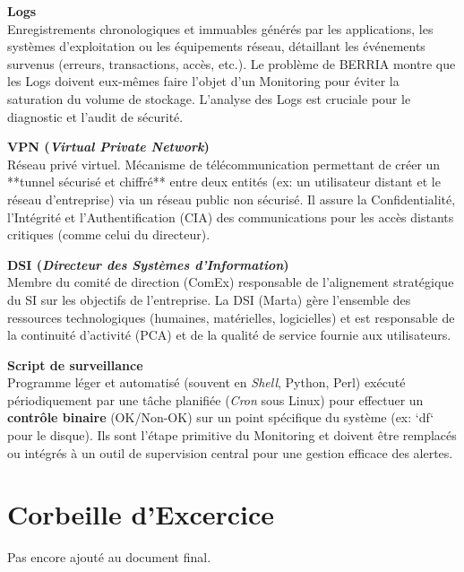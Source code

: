 \noindent \textbf{Logs} \\
Enregistrements chronologiques et immuables générés par les applications, les systèmes d'exploitation ou les équipements réseau, détaillant les événements survenus (erreurs, transactions, accès, etc.). Le problème de BERRIA montre que les Logs doivent eux-mêmes faire l'objet d'un Monitoring pour éviter la saturation du volume de stockage. L'analyse des Logs est cruciale pour le diagnostic et l'audit de sécurité.
\vspace{0.5em}

\noindent \textbf{VPN (\textit{Virtual Private Network})} \\
Réseau privé virtuel. Mécanisme de télécommunication permettant de créer un **tunnel sécurisé et chiffré** entre deux entités (ex: un utilisateur distant et le réseau d'entreprise) via un réseau public non sécurisé. Il assure la Confidentialité, l'Intégrité et l'Authentification (CIA) des communications pour les accès distants critiques (comme celui du directeur).
\vspace{0.5em}

\noindent \textbf{DSI (\textit{Directeur des Systèmes d'Information})} \\
Membre du comité de direction (ComEx) responsable de l'alignement stratégique du SI sur les objectifs de l'entreprise. La DSI (Marta) gère l'ensemble des ressources technologiques (humaines, matérielles, logicielles) et est responsable de la continuité d'activité (PCA) et de la qualité de service fournie aux utilisateurs.
\vspace{0.5em}

\noindent \textbf{Script de surveillance} \\
Programme léger et automatisé (souvent en \textit{Shell}, Python, Perl) exécuté périodiquement par une tâche planifiée (\textit{Cron} sous Linux) pour effectuer un \textbf{contrôle binaire} (OK/Non-OK) sur un point spécifique du système (ex: `df` pour le disque). Ils sont l'étape primitive du Monitoring et doivent être remplacés ou intégrés à un outil de supervision central pour une gestion efficace des alertes.

\newpage

\section*{Corbeille d'Excercice}

Pas encore ajouté au document final.

